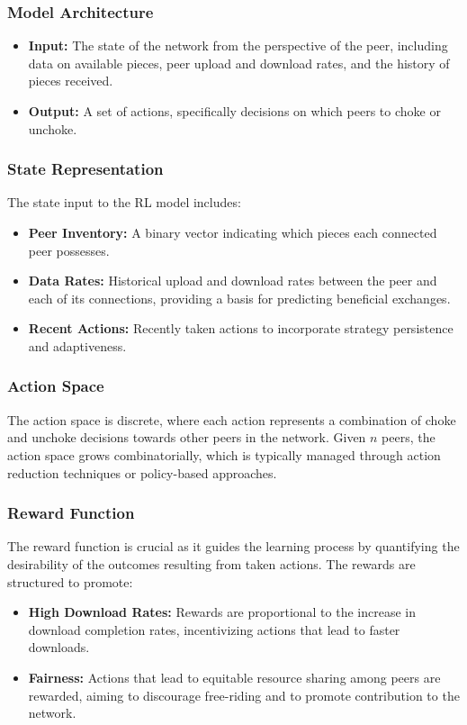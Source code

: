 \documentclass{article}
\begin{document}
\subsubsection{Model Architecture}
\begin{itemize}
    \item \textbf{Input:} The state of the network from the perspective of the peer, including data on available pieces, peer upload and download rates, and the history of pieces received.
    \item \textbf{Output:} A set of actions, specifically decisions on which peers to choke or unchoke.
\end{itemize}

\subsubsection{State Representation}
The state input to the RL model includes:
\begin{itemize}
    \item \textbf{Peer Inventory:} A binary vector indicating which pieces each connected peer possesses.
    \item \textbf{Data Rates:} Historical upload and download rates between the peer and each of its connections, providing a basis for predicting beneficial exchanges.
    \item \textbf{Recent Actions:} Recently taken actions to incorporate strategy persistence and adaptiveness.
\end{itemize}

\subsubsection{Action Space}
The action space is discrete, where each action represents a combination of choke and unchoke decisions towards other peers in the network. Given \( n \) peers, the action space grows combinatorially, which is typically managed through action reduction techniques or policy-based approaches.

\subsubsection{Reward Function}
The reward function is crucial as it guides the learning process by quantifying the desirability of the outcomes resulting from taken actions. The rewards are structured to promote:
\begin{itemize}
    \item \textbf{High Download Rates:} Rewards are proportional to the increase in download completion rates, incentivizing actions that lead to faster downloads.
    \item \textbf{Fairness:} Actions that lead to equitable resource sharing among peers are rewarded, aiming to discourage free-riding and to promote contribution to the network.
\end{itemize}
\end{document}
